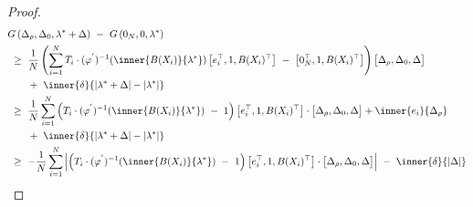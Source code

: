 \begin{proof}
\begin{align*}
  &
  G
   \left( 
\Delta_\rho,\Delta_0,\lambda^*+\Delta
   \right)
   \ 
   -
   \ 
   G
   \left(
0_N,0,\lambda^*
   \right)
   \\
   &
   \ 
   \ge
   \ 
   \frac{1}{N}
  \left( 
\sum_{i=1} 
  ^N
  T_i
  \cdot
  (
  \varphi^{'}
  )
  ^{-1}
  \!
  \left( 
\inner
{B(X_i)}
{
\lambda^*
}
  \right)
  \left[ 
    e_i^\top,1,B(X_i)^\top
  \right]
  \ 
  -
  \ 
  \left[ 
    0_N^\top,1,B(X_i)^\top
  \right]
  \right)
  \begin{bmatrix}
    \Delta_\rho,\Delta_0,\Delta
  \end{bmatrix}
    \\
  &
  \qquad
  +
  \ 
  \inner{\delta}
  {|
\lambda^*
+
\Delta
  |
  -
  |
\lambda^*
  |
}
\\
   &
   \ 
   \ge
   \ 
   \frac{1}{N}
\sum_{i=1} 
  ^N
  \left( 
    T_i\cdot
  (
  \varphi^{'}
  )
  ^{-1}
  \!
  \left( 
\inner
{B(X_i)}
{
\lambda^*
}
  \right)
  \ 
  -
  \ 
  1
  \right)
  \left[ 
    e_i^\top,1,B(X_i)^\top
  \right]
  \cdot
  \begin{bmatrix}
    \Delta_\rho,\Delta_0,\Delta
  \end{bmatrix}
  +
  \inner{e_i}{\Delta_\rho}
  \\
  &
  \qquad
  +
  \ 
  \inner{\delta}
  {|
\lambda^*
+
\Delta
  |
  -
  |
\lambda^*
  |
}
\\
   &
   \ 
   \ge
   \ 
   -
   \frac{1}{N}
\sum_{i=1} 
  ^N
  \left|
   \left( 
     T_i\cdot
  (
  \varphi^{'}
  )
  ^{-1}
  \!
  \left( 
\inner
{B(X_i)}
{
\lambda^*
}
  \right)
  \ 
  -
  \ 
  1
  \right)
  \left[ 
    e_i^\top,1,B(X_i)^\top
  \right]
  \cdot
  \begin{bmatrix}
    \Delta_\rho,\Delta_0,\Delta
  \end{bmatrix}
  \right|
    \ 
  -
  \ 
  \inner{\delta}
  {|
\Delta
  |
}
\end{align*}

\end{proof}
